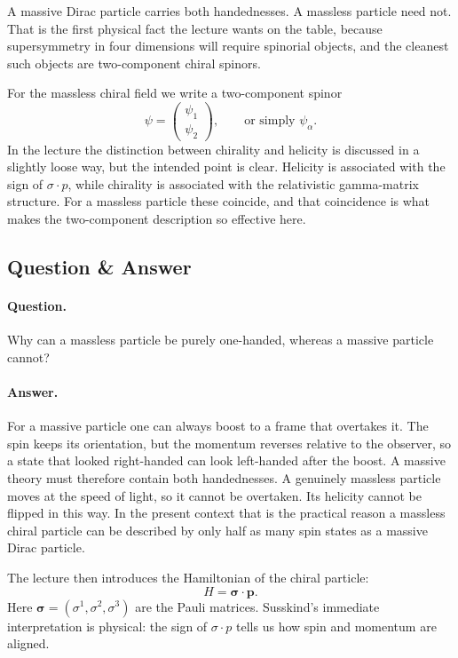 A massive Dirac particle carries both handednesses. A massless particle need not. That is the first physical fact the lecture wants on the table, because supersymmetry in four dimensions will require spinorial objects, and the cleanest such objects are two-component chiral spinors.

For the massless chiral field we write a two-component spinor
\begin{equation}
\psi=
\begin{pmatrix}
\psi_1\\
\psi_2
\end{pmatrix},
\qquad \text{or simply } \psi_\alpha .
\end{equation}
In the lecture the distinction between chirality and helicity is discussed in a slightly loose way, but the intended point is clear. Helicity is associated with the sign of \(\sigma\cdot p\), while chirality is associated with the relativistic gamma-matrix structure. For a massless particle these coincide, and that coincidence is what makes the two-component description so effective here.

\subsection{Question \& Answer}

\paragraph{Question.} Why can a massless particle be purely one-handed, whereas a massive particle cannot?

\paragraph{Answer.} For a massive particle one can always boost to a frame that overtakes it. The spin keeps its orientation, but the momentum reverses relative to the observer, so a state that looked right-handed can look left-handed after the boost. A massive theory must therefore contain both handednesses. A genuinely massless particle moves at the speed of light, so it cannot be overtaken. Its helicity cannot be flipped in this way. In the present context that is the practical reason a massless chiral particle can be described by only half as many spin states as a massive Dirac particle.

The lecture then introduces the Hamiltonian of the chiral particle:
\begin{equation}
H=\boldsymbol{\sigma}\cdot \mathbf{p}.
\end{equation}
Here \(\boldsymbol{\sigma}=(\sigma^1,\sigma^2,\sigma^3)\) are the Pauli matrices. Susskind's immediate interpretation is physical: the sign of \(\sigma\cdot p\) tells us how spin and momentum are aligned.

